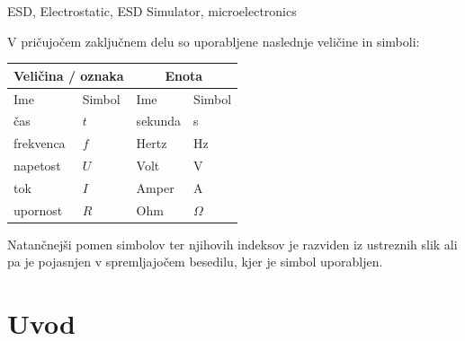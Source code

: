 \documentclass[a4paper,twoside,openright,12pt,slovene]{book}
\begin{document}
\keywords
ESD, Electrostatic, ESD Simulator, microelectronics


\tableofcontents

\seznamslik
\seznamtabel

\seznamsimbolov
V pričujočem zaključnem delu so uporabljene naslednje veličine in simboli:

\begin{center}
    \begin{tabular}{*{4}{l}} \hline
        \multicolumn{2}{c}{\bf{Veličina / oznaka}}           & \multicolumn{2}{c}{\bf{Enota}} \\ \hline
        Ime                & Simbol                          & Ime      & Simbol              \\ \hline
        čas                & $t$                             & sekunda  & s                   \\
        frekvenca          & $f$                             & Hertz    & Hz                  \\
        napetost           & $U$                             & Volt     & V                  \\
        tok                & $I$                             & Amper    & A                   \\
        upornost           & $R$                             & Ohm      & $\Omega$            \\ \hline

    \end{tabular}
\end{center}

Natančnejši pomen simbolov ter njihovih indeksov je razviden iz ustreznih slik ali pa je pojasnjen v spremljajočem besedilu, kjer je simbol uporabljen.

\mainmatter

\chapter{Uvod} \label{uvod}
\end{document}
